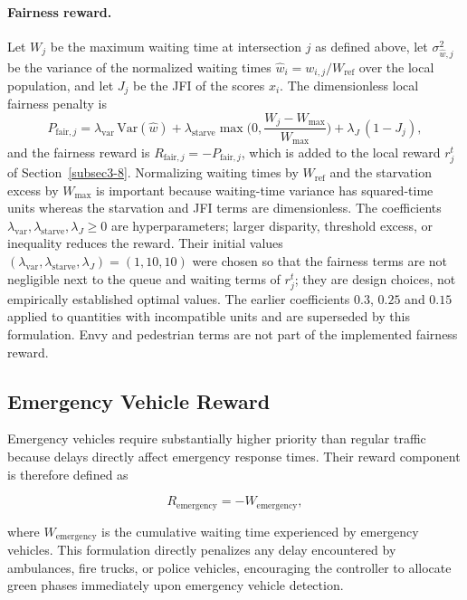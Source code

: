 \documentclass[3p,times]{elsarticle}
\theoremstyle{plain}
\theoremstyle{definition}
\begin{document}
\paragraph{Fairness reward.}
Let $W_j$ be the maximum waiting time at intersection $j$ as defined above, let
$\sigma^2_{\hat w,j}$ be the variance of the normalized waiting times
$\hat w_i=w_{i,j}/W_{\mathrm{ref}}$ over the local population, and let $J_j$ be the JFI of the
scores $x_i$. The dimensionless local fairness penalty is
\begin{equation}
P_{\mathrm{fair},j}=\lambda_{\mathrm{var}}\,\mathrm{Var}(\hat w)
+\lambda_{\mathrm{starve}}\max\!\Big(0,\frac{W_j-W_{\max}}{W_{\max}}\Big)
+\lambda_{J}\,(1-J_j),
\end{equation}
and the fairness reward is $R_{\mathrm{fair},j}=-P_{\mathrm{fair},j}$, which is added to the
local reward $r_j^t$ of Section~\ref{subsec3-8}. Normalizing waiting times by $W_{\mathrm{ref}}$
and the starvation excess by $W_{\max}$ is important because waiting-time variance has
squared-time units whereas the starvation and JFI terms are dimensionless. The coefficients
$\lambda_{\mathrm{var}},\lambda_{\mathrm{starve}},\lambda_J\ge 0$ are hyperparameters; larger
disparity, threshold excess, or inequality reduces the reward. Their initial values
$(\lambda_{\mathrm{var}},\lambda_{\mathrm{starve}},\lambda_J)=(1,10,10)$ were chosen so that the
fairness terms are not negligible next to the queue and waiting terms of $r_j^t$; they are
design choices, not empirically established optimal values. The earlier coefficients $0.3$, $0.25$ and $0.15$ applied to
quantities with incompatible units and are superseded by this formulation. Envy and
pedestrian terms are not part of the implemented fairness reward.

\subsection{Emergency Vehicle Reward}

Emergency vehicles require substantially higher priority than regular
traffic because delays directly affect emergency response times.
Their reward component is therefore defined as

\begin{equation}
R_{\text{emergency}}
=
-W_{\text{emergency}},
\end{equation}

where $W_{\text{emergency}}$ is the cumulative waiting time
experienced by emergency vehicles. This formulation directly
penalizes any delay encountered by ambulances, fire trucks, or police
vehicles, encouraging the controller to allocate green phases
immediately upon emergency vehicle detection.
\end{document}
